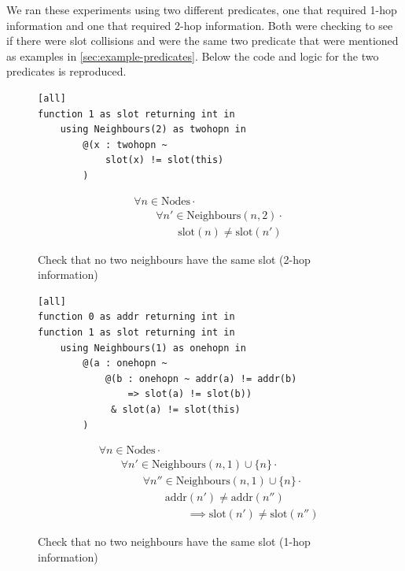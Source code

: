 We ran these experiments using two different predicates, one that required 1-hop information and one that required 2-hop information. Both were checking to see if there were slot collisions and were the same two predicate that were mentioned as examples in \autoref{sec:example-predicates}. Below the code and logic for the two predicates is reproduced.

\begin{figure}[H]
\begin{minipage}{.5\linewidth}
\begin{verbatim}
[all]
function 1 as slot returning int in
    using Neighbours(2) as twohopn in
        @(x : twohopn ~
            slot(x) != slot(this)
        )
\end{verbatim}
\end{minipage}%
\begin{minipage}{.5\linewidth}
\begin{align*}
&				\forall n \in \text{Nodes} \cdot \\
& \hspace{2em}		\forall n' \in \text{Neighbours}(n, 2) \cdot \\
& \hspace{4em}				\text{slot}(n) \neq \text{slot}(n')
\end{align*}
\end{minipage}

\caption{Check that no two neighbours have the same slot (2-hop information)}
\label{fig:two-hop-slot-pred-lang-results}
\end{figure}

\begin{figure}[H]
\begin{minipage}{.5\linewidth}
\begin{verbatim}
[all]
function 0 as addr returning int in
function 1 as slot returning int in
    using Neighbours(1) as onehopn in
        @(a : onehopn ~
            @(b : onehopn ~ addr(a) != addr(b)
                => slot(a) != slot(b))
             & slot(a) != slot(this)
        )
\end{verbatim}
\end{minipage}%
\begin{minipage}{.5\linewidth}
\begin{align*}
&				\forall n \in \text{Nodes} \cdot \\
& \hspace{2em}		\forall n' \in \text{Neighbours}(n, 1) \cup \{n\} \cdot \\
& \hspace{4em}			\forall n'' \in \text{Neighbours}(n, 1) \cup \{n\} \cdot \\
& \hspace{6em}				\text{addr}(n') \not= \text{addr}(n'') \\
& \hspace{8em}					\implies \text{slot}(n') \neq \text{slot}(n'')
\end{align*}
\end{minipage}
\caption{Check that no two neighbours have the same slot (1-hop information)}
\label{fig:one-hop-slot-pred-lang-results}
\end{figure}

